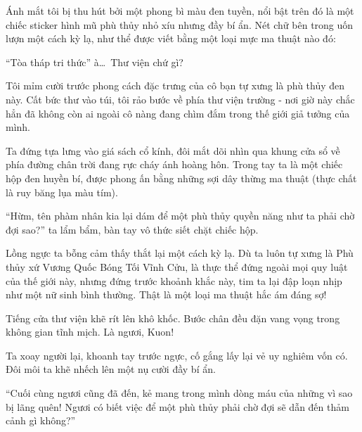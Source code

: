 \documentclass[../main.tex]{subfiles}
\begin{document}
\newpage
\label{shion}

Ánh mắt tôi bị thu hút bởi một phong bì màu đen tuyền, nổi bật trên đó là một chiếc sticker hình mũ phù thủy nhỏ xíu nhưng đầy bí ẩn. Nét chữ bên trong uốn lượn một cách kỳ lạ, như thể được viết bằng một loại mực ma thuật nào đó:


``Tòa tháp tri thức'' à\dots\ Thư viện chứ gì?

Tôi mỉm cười trước phong cách đặc trưng của cô bạn tự xưng là phù thủy đen này. Cất bức thư vào túi, tôi rảo bước về phía thư viện trường - nơi giờ này chắc hẳn đã không còn ai ngoài cô nàng đang chìm đắm trong thế giới giả tưởng của mình.

\ct


Ta đứng tựa lưng vào giá sách cổ kính, đôi mắt dõi nhìn qua khung cửa sổ về phía đường chân trời đang rực cháy ánh hoàng hôn. Trong tay ta là một chiếc hộp đen huyền bí, được phong ấn bằng những sợi dây thừng ma thuật (thực chất là ruy băng lụa màu tím).

``Hừm, tên phàm nhân kia lại dám để một phù thủy quyền năng như ta phải chờ đợi sao?'' ta lẩm bẩm, bàn tay vô thức siết chặt chiếc hộp.

Lồng ngực ta bỗng cảm thấy thắt lại một cách kỳ lạ. Dù ta luôn tự xưng là Phù thủy xứ Vương Quốc Bóng Tối Vĩnh Cửu, là thực thể đứng ngoài mọi quy luật của thế giới này, nhưng đứng trước khoảnh khắc này, tim ta lại đập loạn nhịp như một nữ sinh bình thường. Thật là một loại ma thuật hắc ám đáng sợ!

Tiếng cửa thư viện khẽ rít lên khô khốc. Bước chân đều đặn vang vọng trong không gian tĩnh mịch. Là ngươi, Kuon!

Ta xoay người lại, khoanh tay trước ngực, cố gắng lấy lại vẻ uy nghiêm vốn có. Đôi môi ta khẽ nhếch lên một nụ cười đầy bí ẩn.

``Cuối cùng ngươi cũng đã đến, kẻ mang trong mình dòng máu của những vì sao bị lãng quên! Ngươi có biết việc để một phù thủy phải chờ đợi sẽ dẫn đến thảm cảnh gì không?''
\end{document}
